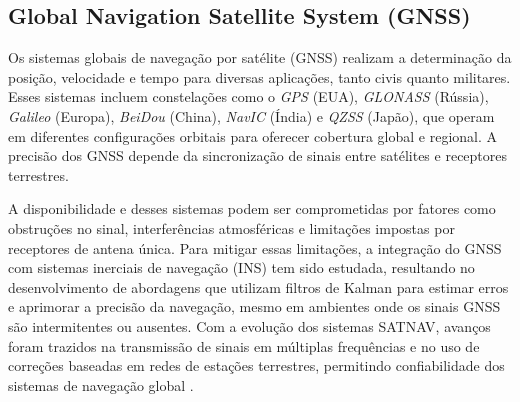 \subsection{Global Navigation Satellite System (GNSS)}

Os sistemas globais de navegação por satélite (GNSS) realizam a determinação da posição, velocidade e tempo para diversas aplicações, tanto civis quanto militares.
Esses sistemas incluem constelações como o \emph{GPS} (EUA), \emph{GLONASS} (Rússia), \emph{Galileo} (Europa), \emph{BeiDou} (China), \emph{NavIC} (Índia) e \emph{QZSS} (Japão), que operam em diferentes configurações orbitais para oferecer cobertura global e regional.
A precisão dos GNSS depende da sincronização de sinais entre satélites e receptores terrestres.

A disponibilidade e desses sistemas podem ser comprometidas por fatores como obstruções no sinal, interferências atmosféricas e limitações impostas por receptores de antena única.
Para mitigar essas limitações, a integração do GNSS com sistemas inerciais de navegação (INS) tem sido estudada, resultando no desenvolvimento de abordagens que utilizam filtros de Kalman para estimar erros e aprimorar a precisão da navegação, mesmo em ambientes onde os sinais GNSS são intermitentes ou ausentes. 
Com a evolução dos sistemas SATNAV, avanços foram trazidos na transmissão de sinais em múltiplas frequências e no uso de correções baseadas em redes de estações terrestres, permitindo confiabilidade dos sistemas de navegação global \cite{kaplan2017}.




